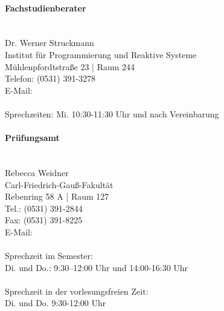 \paragraph{\small{Fachstudienberater}} \ \\
Dr. Werner Struckmann\\
Institut für Programmierung und Reaktive Systeme\\
Mühlenpfordtstraße 23 | Raum 244\\
Telefon: (0531) 391-3278\\
E-Mail: \\
\\
Sprechzeiten: Mi. 10:30-11:30 Uhr und nach  Vereinbarung

\paragraph{\small{Prüfungsamt}} \ \\
Rebecca Weidner\\
Carl-Friedrich-Gauß-Fakultät\\
Rebenring 58 A | Raum 127\\
Tel.: (0531) 391-2844\\
Fax: (0531) 391-8225\\
E-Mail: \\
\\
Sprechzeit im Semester:\\
Di. und Do.:
9:30–12:00 Uhr und 14:00-16:30 Uhr\\
\\
Sprechzeit in der vorlesungsfreien Zeit:\\
Di. und Do.
9:30-12:00 Uhr \\


